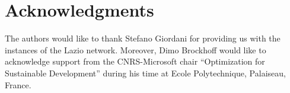 \documentclass[preprint,12pt]{elsarticle}
\newcommand{\COMMENTD}[1]{{\color{green}Dimo: #1}}
\begin{document}
% 


\section{Acknowledgments}
The authors would like to thank Stefano Giordani for providing us with the instances of the Lazio network. Moreover, Dimo Brockhoff would like to acknowledge support from the CNRS-Microsoft chair "`Optimization for Sustainable Development"' during his time at Ecole Polytechnique, Palaiseau, France.


% 
 
 \footnotesize
% 
\end{document}
